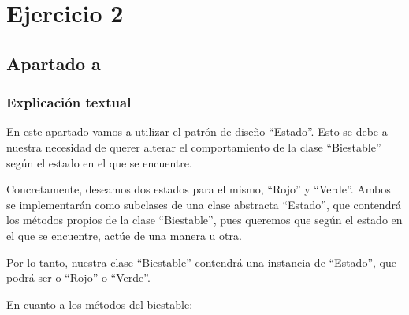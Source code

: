 \documentclass[11pt,a4paper]{article}
\begin{document}
\begin{figure}[H]
\end{figure}



\section{Ejercicio 2}
\subsection{Apartado a}

\subsubsection{Explicación textual}

En este apartado vamos a utilizar el patrón de diseño ``Estado''. Esto se debe a nuestra necesidad de querer alterar el comportamiento de la clase ``Biestable'' según el estado en el que se encuentre.

Concretamente, deseamos dos estados para el mismo, ``Rojo'' y ``Verde''. Ambos se implementarán como subclases de una clase abstracta ``Estado'', que contendrá los métodos propios de la clase ``Biestable'', pues queremos que según el estado en el que se encuentre, actúe de una manera u otra.

Por lo tanto, nuestra clase ``Biestable'' contendrá una instancia de ``Estado'', que podrá ser o ``Rojo'' o ``Verde''.

En cuanto a los métodos del biestable:
\end{document}
